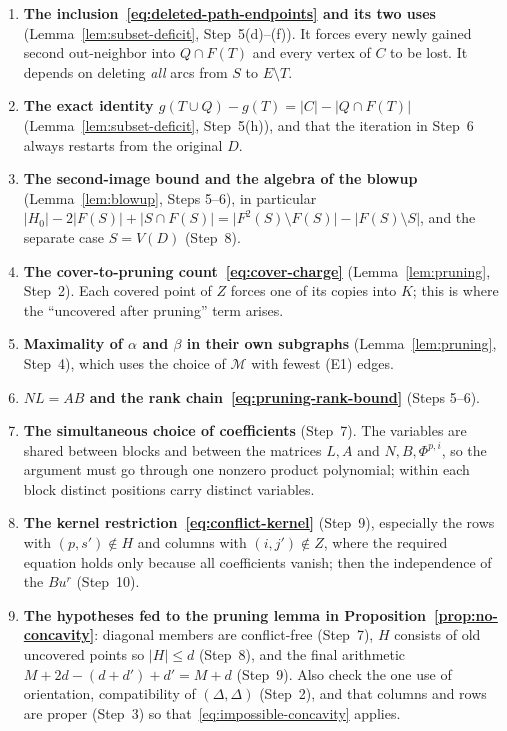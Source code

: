 \documentclass[11pt]{article}
\theoremstyle{remark}
\newcommand{\abs}[1]{\lvert #1\rvert}
\begin{document}
\begin{enumerate}[leftmargin=2em]
\item \textbf{The inclusion~\eqref{eq:deleted-path-endpoints} and its two
uses} (Lemma~\ref{lem:subset-deficit}, Step~5(d)--(f)). It forces every newly
gained second out-neighbor into $Q\cap F(T)$ and every vertex of $C$ to be
lost. It depends on deleting \emph{all} arcs from $S$ to $E\setminus T$.
\item \textbf{The exact identity
$g(T\cup Q)-g(T)=\abs C-\abs{Q\cap F(T)}$} (Lemma~\ref{lem:subset-deficit},
Step~5(h)), and that the iteration in Step~6 always restarts from the
original $D$.
\item \textbf{The second-image bound and the algebra of the blowup}
(Lemma~\ref{lem:blowup}, Steps 5--6), in particular
$\abs{H_0}-2\abs{F(S)}+\abs{S\cap F(S)}
=\abs{F^2(S)\setminus F(S)}-\abs{F(S)\setminus S}$, and the separate case
$S=V(D)$ (Step~8).
\item \textbf{The cover-to-pruning count~\eqref{eq:cover-charge}}
(Lemma~\ref{lem:pruning}, Step~2). Each covered point of $Z$ forces one of
its copies into $K$; this is where the ``uncovered after pruning'' term
arises.
\item \textbf{Maximality of $\alpha$ and $\beta$ in their own subgraphs}
(Lemma~\ref{lem:pruning}, Step~4), which uses the choice of $\mathcal M$ with
fewest (E1) edges.
\item \textbf{$NL=AB$ and the rank chain~\eqref{eq:pruning-rank-bound}}
(Steps 5--6).
\item \textbf{The simultaneous choice of coefficients} (Step~7). The
variables are shared between blocks and between the matrices $L,A$ and
$N,B,\Phi^{p,i}$, so the argument must go through one nonzero product
polynomial; within each block distinct positions carry distinct variables.
\item \textbf{The kernel restriction~\eqref{eq:conflict-kernel}} (Step~9),
especially the rows with $(p,s')\notin H$ and columns with $(i,j')\notin Z$,
where the required equation holds only because all coefficients vanish; then
the independence of the $Bu^r$ (Step~10).
\item \textbf{The hypotheses fed to the pruning lemma in
Proposition~\ref{prop:no-concavity}}: diagonal members are conflict-free
(Step~7), $H$ consists of old uncovered points so $\abs H\le d$ (Step~8),
and the final arithmetic $M+2d-(d+d')+d'=M+d$ (Step~9). Also check the one
use of orientation, compatibility of $(\Delta,\Delta)$ (Step~2), and that
columns and rows are proper (Step~3) so
that~\eqref{eq:impossible-concavity} applies.
\end{enumerate}



\end{document}
